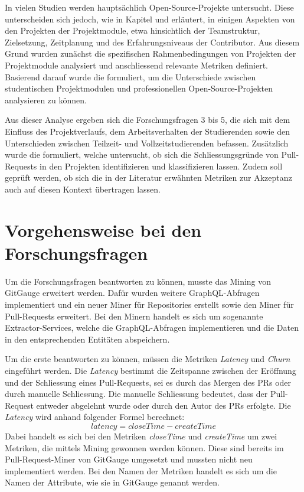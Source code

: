 In vielen Studien werden hauptsächlich Open-Source-Projekte untersucht. Diese unterscheiden sich jedoch, wie in Kapitel  und  erläutert, in einigen Aspekten von den Projekten der Projektmodule, etwa hinsichtlich der Teamstruktur, Zielsetzung, Zeitplanung und des Erfahrungsniveaus der Contributor.
Aus diesem Grund wurden zunächst die spezifischen Rahmenbedingungen von Projekten der Projektmodule analysiert und anschliessend relevante Metriken definiert. Basierend darauf wurde die  formuliert, um die Unterschiede zwischen studentischen Projektmodulen und professionellen Open-Source-Projekten analysieren zu können.

Aus dieser Analyse ergeben sich die Forschungsfragen 3 bis 5, die sich mit dem Einfluss des Projektverlaufs, dem Arbeitsverhalten der Studierenden sowie den Unterschieden zwischen Teilzeit- und Vollzeitstudierenden befassen. Zusätzlich wurde die  formuliert, welche untersucht, ob sich die Schliessungsgründe von Pull-Requests in den Projekten identifizieren und klassifizieren lassen. Zudem soll geprüft werden, ob sich die in der Literatur erwähnten Metriken zur Akzeptanz auch auf diesen Kontext übertragen lassen. 

\section{Vorgehensweise bei den For\-schungs\-fragen}
\label{sec:AnalyseChurnvsLatency}
\label{sec:Metriken}
Um die Forschungsfragen beantworten zu können, musste das Mining von GitGauge erweitert werden. Dafür wurden weitere GraphQL-Abfragen implementiert und ein neuer Miner für Repositories erstellt sowie den Miner für Pull-Requests erweitert. Bei den Minern handelt es sich um sogenannte Extractor-Services, welche die GraphQL-Abfragen implementieren und die Daten in den entsprechenden Entitäten abspeichern.

Um die erste  beantworten zu können, müssen die Metriken \textit{Latency} und \textit{Churn} eingeführt werden. Die \textit{Latency} bestimmt die Zeitspanne zwischen der Eröffnung und der Schliessung eines Pull-Requests, sei es durch das Mergen des PRs oder durch manuelle Schliessung. Die manuelle Schliessung bedeutet, dass der Pull-Request entweder abgelehnt wurde oder durch den Autor des PRs erfolgte. Die \textit{Latency} wird anhand folgender Formel berechnet:
\begin{equation}
latency = closeTime - createTime
\end{equation}
Dabei handelt es sich bei den Metriken \textit{closeTime} und \textit{createTime} um zwei Metriken, die mittels Mining gewonnen werden können. Diese sind bereits im Pull-Request-Miner von GitGauge umgesetzt und mussten nicht neu implementiert werden. Bei den Namen der Metriken handelt es sich um die Namen der Attribute, wie sie in GitGauge genannt werden.

